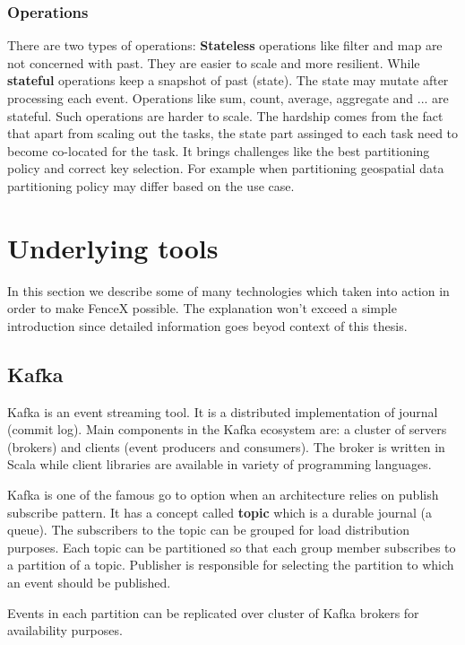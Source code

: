 \documentclass[a4]{report}
\begin{document}
    \subsubsection{Operations}
    There are two types of operations:
    \textbf{Stateless} operations like filter and map are not concerned with past.
    They are easier to scale and more resilient.
    While \textbf{stateful} operations keep a snapshot of past (state).
    The state may mutate after processing each event.
    Operations like sum, count, average, aggregate and ... are stateful.
    Such operations are harder to scale.
    The hardship comes from the fact that apart from scaling out the tasks, the state part assinged to each task need
    to become co-located for the task.
    It brings challenges like the best partitioning policy and correct key selection.
    For example when partitioning geospatial data partitioning policy may differ based on the use case.


    \section{Underlying tools}
    In this section we describe some of many technologies which taken into action in order to make FenceX possible.
    The explanation won't exceed a simple introduction since detailed information goes beyod context of this thesis.

    \subsection{Kafka}
    Kafka\cite{kafka} is an event streaming tool.
    It is a distributed implementation of journal (commit log).
    Main components in the Kafka ecosystem are: a cluster of servers (brokers) and clients (event producers and consumers).
    The broker is written in Scala while client libraries are available in variety of programming languages.

    Kafka is one of the famous go to option when an architecture relies on publish subscribe pattern.
    It has a concept called \textbf{topic} which is a durable journal (a queue).
    The subscribers to the topic can be grouped for load distribution purposes.
    Each topic can be partitioned so that each group member subscribes to a partition of a topic.
    Publisher is responsible for selecting the partition to which an event should be published.

    Events in each partition can be replicated over cluster of Kafka brokers for availability purposes.
\end{document}
